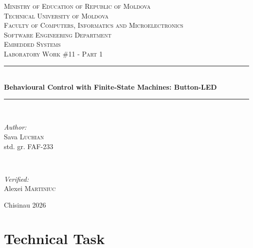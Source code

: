 \documentclass[12pt]{article}
\begin{document}
\begin{titlepage}
  \begin{center}
    \textsc{\large Ministry of Education of Republic of Moldova}\\[0.5cm]
    \textsc{\large Technical University of Moldova}\\[0.5cm]
    \textsc{\large Faculty of Computers, Informatics and Microelectronics}\\[0.5cm]
    \textsc{\large Software Engineering Department}\\[1.2cm]

    \vspace{20mm}
    \textsc{\Large Embedded Systems}\\[0.5cm]
    \textsc{\large Laboratory Work \#11 - Part 1}\\[0.5cm]

    \newcommand{\HRule}{\rule{\linewidth}{0.5mm}}
    \vspace{8mm}
    \HRule\\[0.4cm]
    {\LARGE \bfseries Behavioural Control with Finite-State Machines: Button-LED\\[0.3cm]}
    \HRule\\[1.5cm]

    \begin{minipage}[t]{0.45\textwidth}
      \begin{flushleft}\large
        \emph{Author:}\\
        Sava \textsc{Luchian}\\
        std. gr. FAF-233
      \end{flushleft}
    \end{minipage}
    ~
    \begin{minipage}[t]{0.45\textwidth}
      \begin{flushright}\large
        \emph{Verified:}\\
        Alexei \textsc{Martiniuc}
      \end{flushright}
    \end{minipage}

    \vspace*{\fill}
    \large Chisinau 2026
  \end{center}
\end{titlepage}

\setcounter{page}{2}
\pagestyle{fancy}
\fancyhf{}
\rhead{\thepage}

\section*{Technical Task}
\end{document}
